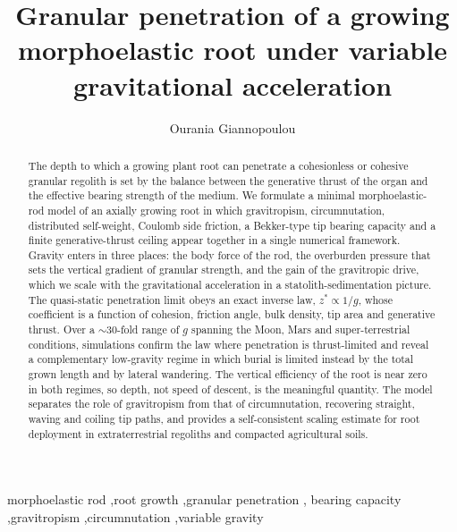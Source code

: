 \documentclass[preprint,12pt]{elsarticle}
\begin{document}
\begin{frontmatter}

\title{Granular penetration of a growing morphoelastic root under variable gravitational acceleration}

\author{Ourania Giannopoulou}
\address[org]{Independent researcher, Rome, Italy}

\begin{abstract}
The depth to which a growing plant root can penetrate a cohesionless or
cohesive granular regolith is set by the balance between the generative
thrust of the organ and the effective bearing strength of the medium. We
formulate a minimal morphoelastic-rod model of an axially growing root in
which gravitropism, circumnutation, distributed self-weight, Coulomb side
friction, a Bekker-type tip bearing capacity and a finite generative-thrust
ceiling appear together in a single numerical framework. Gravity enters in
three places: the body force of the rod, the overburden pressure that sets
the vertical gradient of granular strength, and the gain of the gravitropic
drive, which we scale with the gravitational acceleration in a
statolith-sedimentation picture. The quasi-static penetration limit obeys an
exact inverse law, $z^{*}\propto 1/g$, whose coefficient is a function of
cohesion, friction angle, bulk density, tip area and generative thrust. Over
a $\sim$30-fold range of $g$ spanning the Moon, Mars and super-terrestrial
conditions, simulations confirm the law where penetration is thrust-limited
and reveal a complementary low-gravity regime in which burial is limited
instead by the total grown length and by lateral wandering. The vertical
efficiency of the root is near zero in both regimes, so depth, not speed of
descent, is the meaningful quantity. The model separates the role of
gravitropism from that of circumnutation, recovering straight, waving and
coiling tip paths, and provides a self-consistent scaling estimate for root
deployment in extraterrestrial regoliths and compacted agricultural soils.
\end{abstract}

\begin{keyword}
morphoelastic rod \sep root growth \sep granular penetration \sep
bearing capacity \sep gravitropism \sep circumnutation \sep variable gravity
\end{keyword}

\end{frontmatter}
\end{document}
